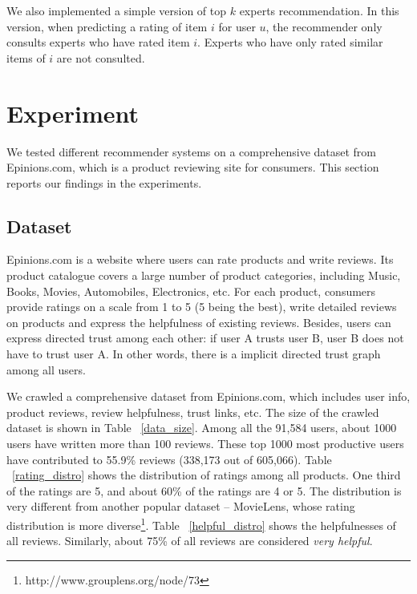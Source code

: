 \documentclass[12pt]{article}
\begin{document}
We also implemented a simple version of top $k$ experts recommendation. In this version, when predicting a rating of item $i$ for user $u$, the recommender only consults experts who have rated item $i$. Experts who have only rated similar items of $i$ are not consulted.
 



\section{Experiment}
We tested different recommender systems on a comprehensive dataset from Epinions.com, which is a product reviewing site for consumers. This section reports our findings in the experiments.  
\subsection{Dataset}
Epinions.com is a website where users can rate products and write reviews. Its product catalogue covers a large number of product categories, including Music, Books, Movies, Automobiles, Electronics, etc. For each product, consumers provide ratings on a scale from 1 to 5 (5 being the best), write detailed reviews on products and express the helpfulness of existing reviews. Besides, users can express directed trust among each other: if user A trusts user B, user B does not have to trust user A. In other words, there is a implicit directed trust graph among all users. 

We crawled a comprehensive dataset from Epinions.com, which includes user info, product reviews, review helpfulness, trust links, etc. The size of the crawled dataset is shown in Table ~\ref{data_size}. Among all the 91,584 users, about 1000 users have written more than 100 reviews. These top 1000 most productive users have contributed to 55.9\% reviews (338,173 out of 605,066).  Table ~\ref{rating_distro} shows the distribution of ratings among all products. One third of the ratings are 5, and about 60\% of the ratings are 4 or 5. The distribution is very different from another popular dataset -- MovieLens, whose rating distribution is more diverse\footnote[1]{http://www.grouplens.org/node/73}. Table ~\ref{helpful_distro} shows the helpfulnesses of all reviews. Similarly, about 75\% of all reviews are considered \emph{very helpful}. 
\end{document}
